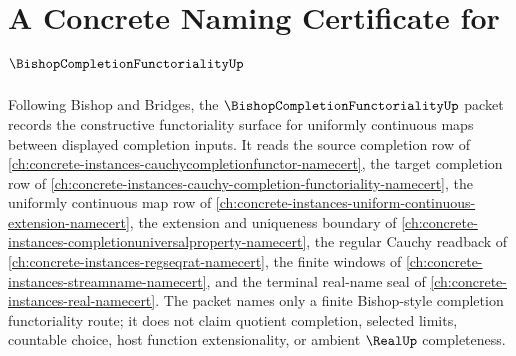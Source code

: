 \chapter{A Concrete Naming Certificate for $\BishopCompletionFunctorialityUp$}
\label{ch:concrete-instances-bishop-completion-functoriality-namecert}

Following Bishop and Bridges, the $\BishopCompletionFunctorialityUp$ packet records the constructive functoriality surface for uniformly continuous maps between displayed completion inputs. It reads the source completion row of \autoref{ch:concrete-instances-cauchycompletionfunctor-namecert}, the target completion row of \autoref{ch:concrete-instances-cauchy-completion-functoriality-namecert}, the uniformly continuous map row of \autoref{ch:concrete-instances-uniform-continuous-extension-namecert}, the extension and uniqueness boundary of \autoref{ch:concrete-instances-completionuniversalproperty-namecert}, the regular Cauchy readback of \autoref{ch:concrete-instances-regseqrat-namecert}, the finite windows of \autoref{ch:concrete-instances-streamname-namecert}, and the terminal real-name seal of \autoref{ch:concrete-instances-real-namecert}. The packet names only a finite Bishop-style completion functoriality route; it does not claim quotient completion, selected limits, countable choice, host function extensionality, or ambient $\RealUp$ completeness.

